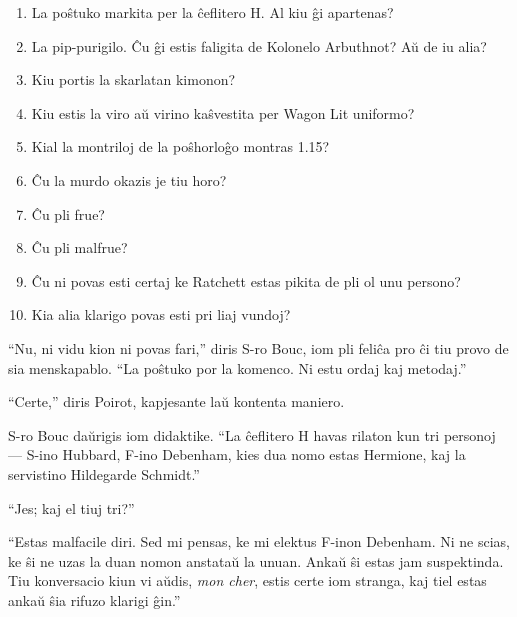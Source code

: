 \begin{enumerate}
\item La poŝtuko markita per la ĉeflitero H. Al kiu ĝi apartenas?

\item \vspace{-10pt}La pip-purigilo. Ĉu ĝi estis faligita de Kolonelo Arbuthnot? Aŭ de iu alia?

\item \vspace{-10pt}Kiu portis la skarlatan kimonon?

\item \vspace{-10pt}Kiu estis la viro aŭ virino kaŝvestita per Wagon Lit uniformo?

\item \vspace{-10pt}Kial la montriloj de la poŝhorloĝo montras 1.15?

\item \vspace{-10pt}Ĉu la murdo okazis je tiu horo?

\item \vspace{-10pt}Ĉu pli frue?

\item \vspace{-10pt}Ĉu pli malfrue?

\item \vspace{-10pt}Ĉu ni povas esti certaj ke Ratchett estas pikita de pli ol unu persono?

\item \vspace{-10pt}Kia alia klarigo povas esti pri liaj vundoj?

\end{enumerate}

``Nu, ni vidu kion ni povas fari,'' diris S-ro Bouc, iom pli feliĉa pro ĉi tiu provo de sia menskapablo. ``La poŝtuko por la komenco. Ni estu ordaj kaj metodaj.''

``Certe,'' diris Poirot, kapjesante laŭ kontenta maniero.

S-ro Bouc daŭrigis iom didaktike. ``La ĉeflitero H havas rilaton kun tri personoj --- S-ino Hubbard, F-ino Debenham, kies dua nomo estas Hermione, kaj la servistino Hildegarde Schmidt.''

``Jes; kaj el tiuj tri?''

``Estas malfacile diri. Sed mi pensas, ke mi elektus F-inon Debenham. Ni ne scias, ke ŝi ne uzas la duan nomon anstataŭ la unuan. Ankaŭ ŝi estas jam suspektinda. Tiu konversacio kiun vi aŭdis, \emph{mon cher}, estis certe iom stranga, kaj tiel estas ankaŭ ŝia rifuzo klarigi ĝin.''


